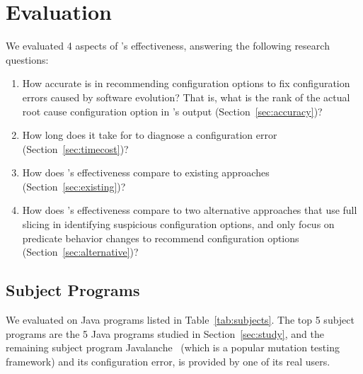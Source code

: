 
\section{Evaluation}
\label{sec:evaluation}

We evaluated 4 aspects of \ourtool's effectiveness, answering
the following research questions:

\begin{enumerate}
\item How accurate is \ourtool in recommending configuration options
to fix configuration errors caused by software evolution? That is, what is the rank of the
actual root cause configuration option in \ourtool's output (Section~\ref{sec:accuracy})?

\item How long does it take for \ourtool to diagnose
a configuration error (Section~\ref{sec:timecost})?

\item How does \ourtool's effectiveness compare to
existing approaches (Section~\ref{sec:existing})?

\item How does \ourtool's effectiveness compare to
two alternative approaches that use full slicing in identifying
suspicious configuration options, and only focus on predicate behavior
changes to recommend configuration options (Section~\ref{sec:alternative})?

\end{enumerate}

\subsection{Subject Programs}

We evaluated \ourtool on \subjnum Java programs
listed in Table~\ref{tab:subjects}.
The top 5 subject programs are the 5 Java programs
studied in Section~\ref{sec:study},
and the remaining subject program Javalanche~\cite{javalanche}
(which is a popular mutation testing framework) and
its configuration error, is provided by one of its real users.

\newcommand{\randoopoptnum}{57\xspace}
\newcommand{\wekaoptnum}{14\xspace}
\newcommand{\synopticoptnum}{37\xspace}
\newcommand{\jchordoptnum}{79\xspace}
\newcommand{\jmeteroptnum}{55\xspace}
\newcommand{\javalancheoptnum}{35\xspace}

\newcommand{\randooprank}{1\xspace}
\newcommand{\wekarank}{1\xspace}
\newcommand{\synopticrankfirst}{1\xspace}
\newcommand{\synopticranksecond}{6\xspace}
\newcommand{\jchordrankfirst}{1\xspace}
\newcommand{\jchordranksecond}{1\xspace}
\newcommand{\jmeterrank}{1\xspace}
\newcommand{\javalancherank}{3\xspace}

